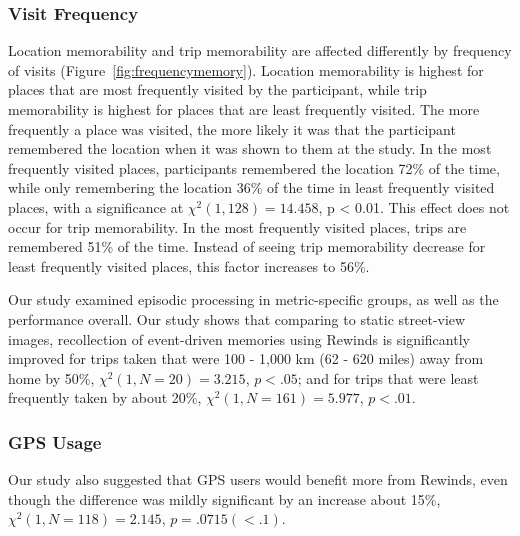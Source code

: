 \documentclass{sigchi}
\begin{document}
\subsubsection{Visit Frequency}
Location memorability and trip memorability are affected differently by frequency of visits (Figure~\ref{fig:frequencymemory}). Location memorability is highest for places that are most frequently visited by the participant, while trip memorability is highest for places that are least frequently visited. The more frequently a place was visited, the more likely it was that the participant remembered the location when it was shown to them at the study. In the most frequently visited places, participants remembered the location 72\% of the time, while only remembering the location 36\% of the time in least frequently visited places, with a significance at $\chi^2(1,128) = 14.458$, p < 0.01. This effect does not occur for trip memorability. In the most frequently visited places, trips are remembered 51\% of the time. Instead of seeing trip memorability decrease for least frequently visited places, this factor increases to 56\%.

Our study examined episodic processing in metric-specific groups, as well as the performance overall. Our study shows that comparing to static street-view images, recollection of event-driven memories using Rewinds is significantly improved for trips taken that were 100 - 1,000 km (62 - 620 miles) away from home by 50\%, $\chi^2(1, N=20) = 3.215$, $p <.05$; and for trips that were least frequently taken by about 20\%, $\chi^2(1, N=161) = 5.977$, $p <.01$. 

\subsubsection{GPS Usage}
Our study also suggested that GPS users would benefit more from Rewinds, even though the difference was mildly significant by an increase about 15\%, $\chi^2(1, N=118) = 2.145$, $p = .0715 (<.1)$. 
\end{document}
